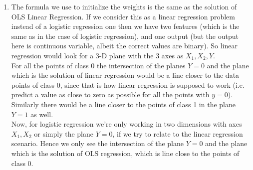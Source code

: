 \documentclass[twoside]{article}
\begin{document}
\begin{enumerate}
	\item
	The formula we use to initialize the weights is the same as the solution of OLS Linear Regression. If we consider this as a linear regression problem instead of a logistic regression one then we have two features (which is the same as in the case of logistic regression), and one output (but the output here is continuous variable, albeit the correct values are binary). So linear regression would look for a 3-D plane with the 3 axes as $X_1, X_2, Y$.\\
	For all the points of class 0 the intersection of the planes $Y=0$ and the plane which is the solution of linear regression would be a line closer to the data points of class 0, since that is how linear regression is supposed to work (i.e. predict a value as close to zero as possible for all the points with $y=0$). Similarly there would be a line closer to the points of class 1 in the plane $Y=1$ as well.\\
	Now, for logistic regression we're only working in two dimensions with axes $X_1, X_2$ or simply the plane $Y=0$, if we try to relate to the linear regression scenario. Hence we only see the intersection of the plane $Y = 0$ and the plane which is the solution of OLS regression, which is line close to the points of class 0.
	

\end{enumerate}
\end{document}
